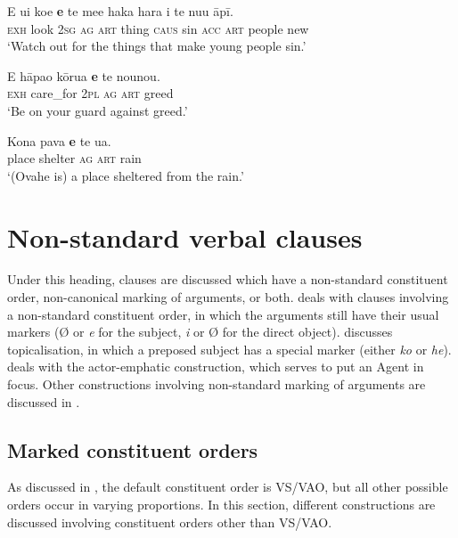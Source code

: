 \ea\label{ex:8.66}
\gll E u{\ꞌ}i koe \textbf{e} te me{\ꞌ}e haka hara i te nu{\ꞌ}u {\ꞌ}āpī. \\
\textsc{exh} look \textsc{2sg} \textsc{ag} \textsc{art} thing \textsc{caus} sin \textsc{acc} \textsc{art} people new \\

\glt 
‘Watch out for the things that make young people sin.’ \textstyleExampleref{[2 Tim. 2:22]}
\z

\ea\label{ex:8.67}
\gll E hāpa{\ꞌ}o kōrua \textbf{e} te nounou. \\
\textsc{exh} care\_for \textsc{2pl} \textsc{ag} \textsc{art} greed \\

\glt 
‘Be on your guard against greed.’ \textstyleExampleref{[Luke 12:15]}
\z

\ea\label{ex:8.68}
\gll Kona pava \textbf{e} te {\ꞌ}ua.\\
place shelter \textsc{ag} \textsc{art} rain\\

\glt 
‘(Ovahe is) a place sheltered from the rain.’ \textstyleExampleref{[R157.024]} 
\z
{}
\section{Non-standard verbal clauses}\label{sec:8.6}

Under this heading, clauses are discussed which have a non-standard constituent order, non-canonical marking of arguments, or both.  deals with clauses involving a non-standard constituent order, in which the arguments still have their usual markers (Ø or \textit{e} for the subject, \textit{i} or Ø for the direct object).  discusses topicalisation, in which a preposed subject has a special marker (either \textit{ko} or \textit{he}).  deals with the actor-emphatic construction, which serves to put an Agent in focus. Other constructions involving non-standard marking of arguments are discussed in . 

\subsection{Marked constituent orders}\label{sec:8.6.1}

As discussed in , the default constituent order is VS/VAO, but all other possible orders occur in varying proportions. In this section, different constructions are discussed involving constituent orders other than VS/VAO. 

